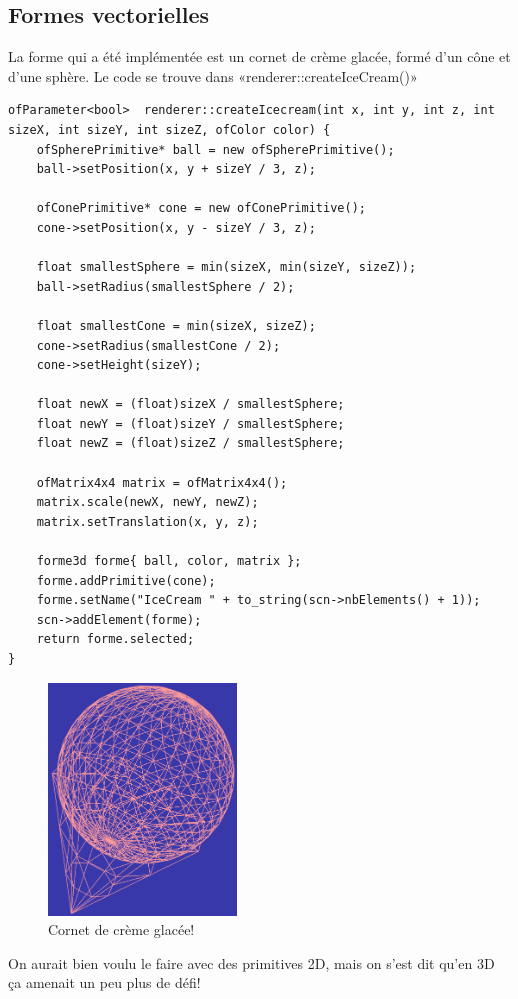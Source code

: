 \subsection{Formes vectorielles}
La forme qui a été implémentée est un cornet de crème glacée, formé d'un cône et d'une sphère. Le code se trouve dans «renderer::createIceCream()» 

\begin{lstlisting}
ofParameter<bool>  renderer::createIcecream(int x, int y, int z, int sizeX, int sizeY, int sizeZ, ofColor color) {
	ofSpherePrimitive* ball = new ofSpherePrimitive();
	ball->setPosition(x, y + sizeY / 3, z);
	
	ofConePrimitive* cone = new ofConePrimitive();
	cone->setPosition(x, y - sizeY / 3, z);
	
	float smallestSphere = min(sizeX, min(sizeY, sizeZ));
	ball->setRadius(smallestSphere / 2);
	
	float smallestCone = min(sizeX, sizeZ);
	cone->setRadius(smallestCone / 2);
	cone->setHeight(sizeY);
	
	float newX = (float)sizeX / smallestSphere;
	float newY = (float)sizeY / smallestSphere;
	float newZ = (float)sizeZ / smallestSphere;
	
	ofMatrix4x4 matrix = ofMatrix4x4();
	matrix.scale(newX, newY, newZ);
	matrix.setTranslation(x, y, z);
	
	forme3d forme{ ball, color, matrix };
	forme.addPrimitive(cone);
	forme.setName("IceCream " + to_string(scn->nbElements() + 1));
	scn->addElement(forme);
	return forme.selected;
}
\end{lstlisting}

\begin{figure}[h]
	\centering
	\includegraphics[width=5cm]{fig/iceCream.png}
	\caption{Cornet de crème glacée!}
	\label{fig:iceCream}
\end{figure}

On aurait bien voulu le faire avec des primitives 2D, mais on s'est dit qu'en 3D ça amenait un peu plus de défi!

